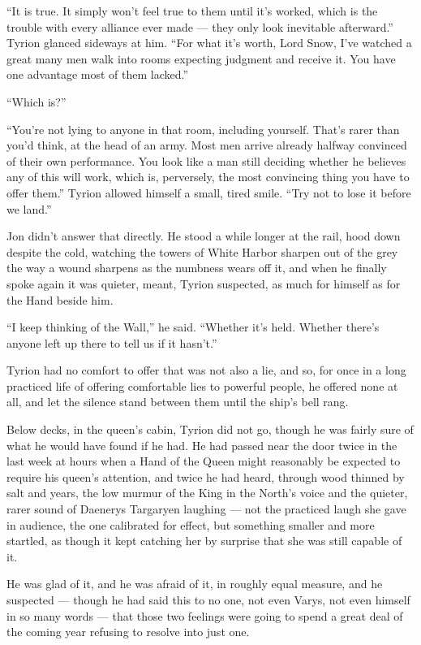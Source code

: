 “It is true. It simply won’t feel true to them until it’s worked, which is the trouble with every alliance ever made — they only look inevitable afterward.” Tyrion glanced sideways at him. “For what it’s worth, Lord Snow, I’ve watched a great many men walk into rooms expecting judgment and receive it. You have one advantage most of them lacked.”

“Which is?”

“You’re not lying to anyone in that room, including yourself. That’s rarer than you’d think, at the head of an army. Most men arrive already halfway convinced of their own performance. You look like a man still deciding whether he believes any of this will work, which is, perversely, the most convincing thing you have to offer them.” Tyrion allowed himself a small, tired smile. “Try not to lose it before we land.”

Jon didn’t answer that directly. He stood a while longer at the rail, hood down despite the cold, watching the towers of White Harbor sharpen out of the grey the way a wound sharpens as the numbness wears off it, and when he finally spoke again it was quieter, meant, Tyrion suspected, as much for himself as for the Hand beside him.

“I keep thinking of the Wall,” he said. “Whether it’s held. Whether there’s anyone left up there to tell us if it hasn’t.”

Tyrion had no comfort to offer that was not also a lie, and so, for once in a long practiced life of offering comfortable lies to powerful people, he offered none at all, and let the silence stand between them until the ship’s bell rang.

\sceneBreak

Below decks, in the queen’s cabin, Tyrion did not go, though he was fairly sure of what he would have found if he had. He had passed near the door twice in the last week at hours when a Hand of the Queen might reasonably be expected to require his queen’s attention, and twice he had heard, through wood thinned by salt and years, the low murmur of the King in the North’s voice and the quieter, rarer sound of Daenerys Targaryen laughing — not the practiced laugh she gave in audience, the one calibrated for effect, but something smaller and more startled, as though it kept catching her by surprise that she was still capable of it.

He was glad of it, and he was afraid of it, in roughly equal measure, and he suspected — though he had said this to no one, not even Varys, not even himself in so many words — that those two feelings were going to spend a great deal of the coming year refusing to resolve into just one.

